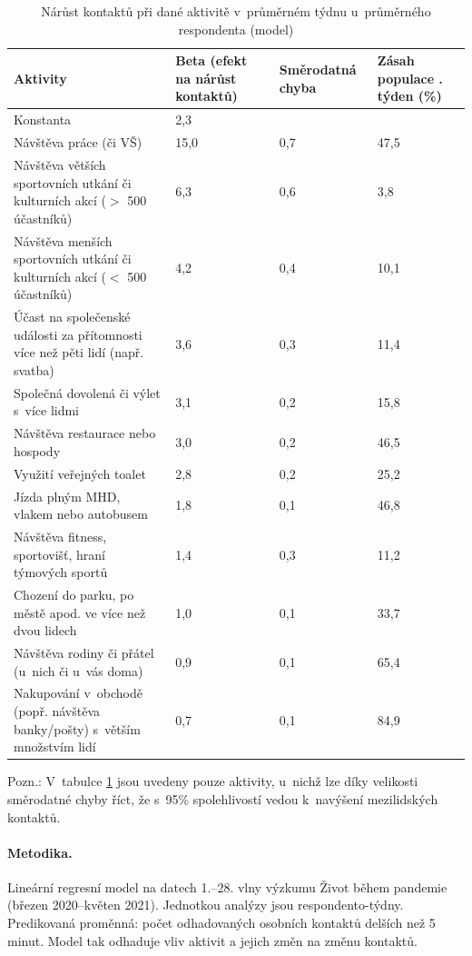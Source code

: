 \begin{table}[ht]
    \centering
    \caption{Nárůst kontaktů při dané aktivitě v průměrném týdnu u~průměrného respondenta (model)}
    
\begin{tabular}{ p{5cm} p{2cm} p{2cm} p{2cm}  }
 \hline
 Aktivity & Beta \newline (efekt na \newline nárůst kontaktů) & Směrodatná \newline chyba & Zásah populace \newline 23. týden (\%)\\
 \hline
 Konstanta   & 2,3    & & \\
 Návštěva práce (či VŠ) & 15,0 & 0,7 &47,5\\
 Návštěva větších sportovních utkání či kulturních akcí ($>$ 500 účastníků) &
6,3 &
0,6 &
3,8\\
  Návštěva menších sportovních utkání či kulturních akcí ($<$ 500 účastníků)&
4,2&
0,4&
10,1\\
  Účast na společenské události za přítomnosti více než pěti lidí (např. svatba)&
3,6&
0,3&
11,4\\
  Společná dovolená či výlet s~více lidmi&
3,1&
0,2&
15,8\\
  Návštěva restaurace nebo hospody&
3,0&
0,2&
46,5\\
  Využití veřejných toalet&
2,8&
0,2&
25,2\\
  Jízda plným MHD, vlakem nebo autobusem&
1,8&
0,1&
46,8\\
  Návštěva fitness, sportovišť, hraní týmových sportů&
1,4&
0,3&
11,2\\
  Chození do parku, po městě apod. ve více než dvou lidech&
1,0&
0,1&
33,7\\
  Návštěva rodiny či přátel (u~nich či u~vás doma)&
0,9&
0,1&
65,4\\
  Nakupování v~obchodě (popř. návštěva banky/pošty) s~větším množstvím lidí&
0,7&
0,1&
84,9\\
 \hline
\end{tabular}
    
    \label{tab:narust-kontaktu}
\end{table}

Pozn.: V tabulce \ref{tab:narust-kontaktu} jsou uvedeny pouze aktivity, u~nichž lze díky velikosti směrodatné chyby říct, že s~95\% spolehlivostí vedou k navýšení mezilidských kontaktů.

\vspace{1em}
\paragraph{Metodika.} Lineární regresní model na datech 1.--28. vlny výzkumu Život během pandemie (březen 2020–květen 2021). Jednotkou analýzy jsou respondento-týdny. Predikovaná proměnná: počet odhadovaných osobních kontaktů delších než 5 minut. Model tak odhaduje vliv aktivit a jejich změn na změnu kontaktů.

